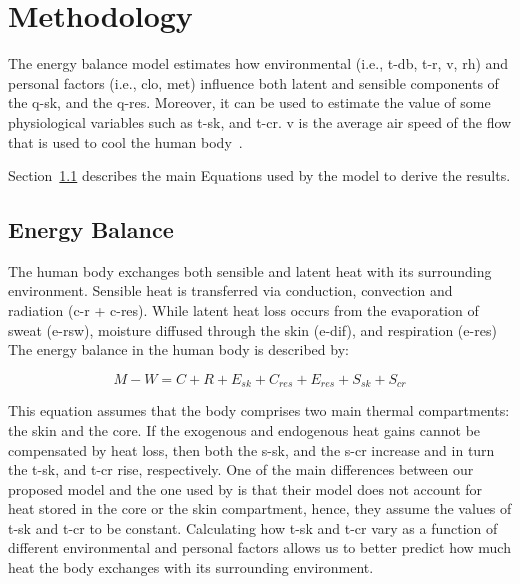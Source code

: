 
\section{Methodology}\label{sec:methodology}

The energy balance model estimates how environmental (i.e., \ac{t-db}, \ac{t-r}, \ac{v}, \ac{rh}) and personal factors (i.e., \ac{clo}, \ac{met}) influence both latent and sensible components of the \ac{q-sk}, and the \ac{q-res}.
Moreover, it can be used to estimate the value of some physiological variables such as \ac{t-sk}, and \ac{t-cr}.
\ac{v} is the average air speed of the flow that is used to cool the human body~\cite{Huang2014}.

Section~\ref{subsec:energy-balance} describes the main Equations used by the model to derive the results.

\subsection{Energy Balance}\label{subsec:energy-balance}

The human body exchanges both sensible and latent heat with its surrounding environment.
Sensible heat is transferred via conduction, convection and radiation (\acs{c-r} + \acs{c-res}).
While latent heat loss occurs from the evaporation of sweat (\acs{e-rsw}), moisture diffused through the skin  (\acs{e-dif}), and respiration (\acs{e-res})
The energy balance in the human body is described by:

\begin{equation}
    M - W = C + R + E_{sk} + C_{res} + E_{res} + S_{sk} + S_{cr}\label{eq:heat-balance}
\end{equation}

This equation assumes that the body comprises two main thermal compartments: the skin and the core.
If the exogenous and endogenous heat gains cannot be compensated by heat loss, then both the \ac{s-sk}, and the \ac{s-cr} increase and in turn the \ac{t-sk}, and \ac{t-cr} rise, respectively.
One of the main differences between our proposed model and the one used by  is that their model does not account for heat stored in the core or the skin compartment, hence, they assume the values of \ac{t-sk} and \ac{t-cr} to be constant.
Calculating how \ac{t-sk} and \ac{t-cr} vary as a function of different environmental and personal factors allows us to better predict how much heat the body exchanges with its surrounding environment.


